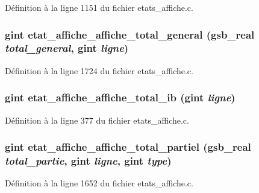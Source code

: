Définition à la ligne 1151 du fichier etats\_\-affiche.c.

\subsubsection[{etat\_\-affiche\_\-affiche\_\-total\_\-general}]{\setlength{\rightskip}{0pt plus 5cm}gint etat\_\-affiche\_\-affiche\_\-total\_\-general ({\bf gsb\_\-real} {\em total\_\-general}, \/  gint {\em ligne})}\label{etats__affiche_8h_ae7d557c89ed939a2d6c553647a0f2d8e}


Définition à la ligne 1724 du fichier etats\_\-affiche.c.

\subsubsection[{etat\_\-affiche\_\-affiche\_\-total\_\-ib}]{\setlength{\rightskip}{0pt plus 5cm}gint etat\_\-affiche\_\-affiche\_\-total\_\-ib (gint {\em ligne})}\label{etats__affiche_8h_a8efa140053832991d342959e71ea96fe}


Définition à la ligne 377 du fichier etats\_\-affiche.c.

\subsubsection[{etat\_\-affiche\_\-affiche\_\-total\_\-partiel}]{\setlength{\rightskip}{0pt plus 5cm}gint etat\_\-affiche\_\-affiche\_\-total\_\-partiel ({\bf gsb\_\-real} {\em total\_\-partie}, \/  gint {\em ligne}, \/  gint {\em type})}\label{etats__affiche_8h_ad978bb179e6046a57722765b1c880b4b}


Définition à la ligne 1652 du fichier etats\_\-affiche.c.

